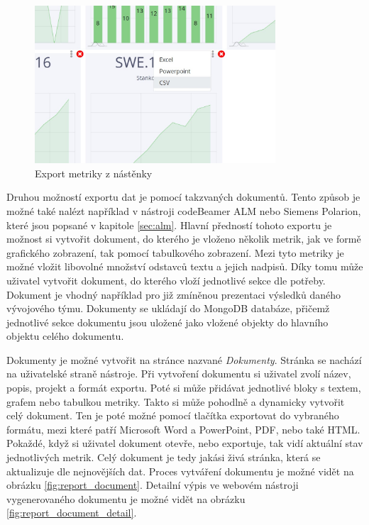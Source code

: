 \documentclass[czech,master]{diploma}
\begin{document}
\begin{figure}[!ht]
    \centering
    \includegraphics[width=0.8\textwidth]{Diplomka/Figures/dashboard_export.jpg}
    \caption{Export metriky z nástěnky}
    \label{fig:dashboard_export}
\end{figure}

Druhou možností exportu dat je pomocí takzvaných dokumentů. Tento způsob je možné také nalézt například v nástroji codeBeamer ALM nebo Siemens Polarion, které jsou popsané v kapitole \ref{sec:alm}. Hlavní předností tohoto exportu je možnost si vytvořit dokument, do kterého je vloženo několik metrik, jak ve formě grafického zobrazení, tak pomocí tabulkového zobrazení. Mezi tyto metriky je možné vložit libovolné množství odstavců textu a jejich nadpisů. Díky tomu může uživatel vytvořit dokument, do kterého vloží jednotlivé sekce dle potřeby. Dokument je vhodný například pro již zmíněnou prezentaci výsledků daného vývojového týmu. Dokumenty se ukládají do MongoDB databáze, přičemž jednotlivé sekce dokumentu jsou uložené jako vložené objekty do hlavního objektu celého dokumentu. 

Dokumenty je možné vytvořit na stránce nazvané \textit{Dokumenty}. Stránka se nachází na uživatelské straně nástroje. Při vytvoření dokumentu si uživatel zvolí název, popis, projekt a formát exportu. Poté si může přidávat  jednotlivé bloky s textem, grafem nebo tabulkou metriky. Takto si může pohodlně a dynamicky vytvořit celý dokument. Ten je poté možné pomocí tlačítka exportovat do vybraného formátu, mezi které patří Microsoft Word a PowerPoint, PDF, nebo také HTML. Pokaždé, když si uživatel dokument otevře, nebo exportuje, tak vidí aktuální stav jednotlivých metrik. Celý dokument je tedy jakási živá stránka, která se aktualizuje dle nejnovějších dat. Proces vytváření dokumentu je možné vidět na obrázku \ref{fig:report_document}. Detailní výpis ve webovém nástroji vygenerovaného dokumentu je možné vidět na obrázku \ref{fig:report_document_detail}.
\end{document}
